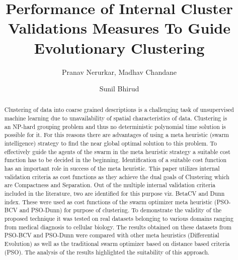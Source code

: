 \documentclass{svproc}
\begin{document}
\mainmatter              %
%
\title{Performance of Internal Cluster Validations Measures To Guide Evolutionary Clustering}
\author{Pranav Nerurkar, Madhav Chandane \and Sunil Bhirud}
%

%


\maketitle              %

\begin{abstract}
Clustering of data into coarse grained descriptions is a challenging task of unsupervised machine learning due to unavailability of spatial characteristics of data. Clustering is an NP-hard grouping problem and thus no deterministic polynomial time solution is possible for it. For this reasons there are advantages of using a meta heuristic (swarm intelligence) strategy to find the near global optimal solution to this problem. To effectively guide the agents of the swarm in the meta heuristic strategy a suitable cost function has to be decided in the beginning. Identification of a suitable cost function has an important role in success of the meta heuristic. This paper utilizes internal validation criteria as cost functions as they achieve the dual goals of Clustering which are Compactness and Separation. Out of the multiple internal validation criteria included in the literature, two are identified for this purpose viz. BetaCV and Dunn index. These were used as cost functions of the swarm optimizer meta heuristic (PSO-BCV and PSO-Dunn) for purpose of clustering. To demonstrate the validity of the proposed technique it was tested on real datasets belonging to various domains ranging from medical diagnosis to cellular biology. The results obtained on these datasets from PSO-BCV and PSO-Dunn were compared with other meta heuristics (Differential Evolution) as well as the traditional swarm optimizer based on distance based criteria (PSO). The analysis of the results highlighted the suitability of this approach. 
\end{abstract}
%
\end{document}
